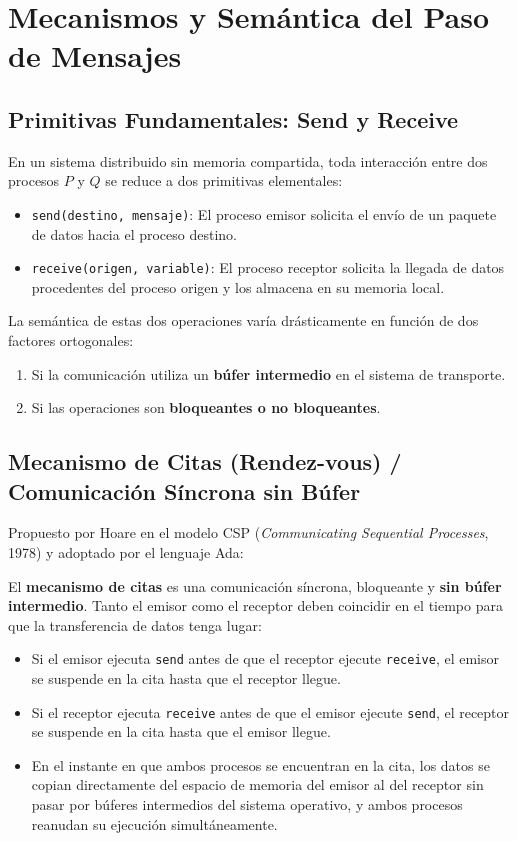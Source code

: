\section{Mecanismos y Semántica del Paso de Mensajes}

\subsection{Primitivas Fundamentales: Send y Receive}
En un sistema distribuido sin memoria compartida, toda interacción entre dos procesos $P$ y $Q$ se reduce a dos primitivas elementales:
\begin{itemize}[leftmargin=*]
    \item \texttt{send(destino, mensaje)}: El proceso emisor solicita el envío de un paquete de datos hacia el proceso destino.
    \item \texttt{receive(origen, variable)}: El proceso receptor solicita la llegada de datos procedentes del proceso origen y los almacena en su memoria local.
\end{itemize}

La semántica de estas dos operaciones varía drásticamente en función de dos factores ortogonales:
\begin{enumerate}
    \item Si la comunicación utiliza un \textbf{búfer intermedio} en el sistema de transporte.
    \item Si las operaciones son \textbf{bloqueantes o no bloqueantes}.
\end{enumerate}

\subsection{Mecanismo de Citas (Rendez-vous) / Comunicación Síncrona sin Búfer}
Propuesto por Hoare en el modelo CSP (\emph{Communicating Sequential Processes}, 1978) y adoptado por el lenguaje Ada:

\begin{definicion}
El \textbf{mecanismo de citas} es una comunicación síncrona, bloqueante y \textbf{sin búfer intermedio}. Tanto el emisor como el receptor deben coincidir en el tiempo para que la transferencia de datos tenga lugar:
\begin{itemize}[leftmargin=*]
    \item Si el emisor ejecuta \texttt{send} antes de que el receptor ejecute \texttt{receive}, el emisor se suspende en la cita hasta que el receptor llegue.
    \item Si el receptor ejecuta \texttt{receive} antes de que el emisor ejecute \texttt{send}, el receptor se suspende en la cita hasta que el emisor llegue.
    \item En el instante en que ambos procesos se encuentran en la cita, los datos se copian directamente del espacio de memoria del emisor al del receptor sin pasar por búferes intermedios del sistema operativo, y ambos procesos reanudan su ejecución simultáneamente.
\end{itemize}
\end{definicion}

